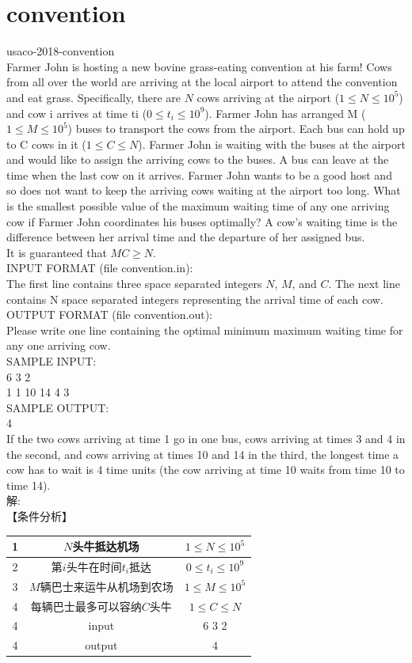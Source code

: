 \documentclass[12pt,twiside,a4paper]{ctexbook}
\numberwithin{chapter}{part}
\begin{document}
\section{convention}
usaco-2018-convention\\
Farmer John is hosting a new bovine grass-eating convention at his farm!
Cows from all over the world are arriving at the local airport to attend the convention and eat grass. Specifically, there are $N$ cows arriving at the airport ($1\leq N\leq 10^5$) and cow i arrives at time ti ($0\leq t_i\leq 10^9$). Farmer John has arranged M ($1\leq M\leq 10^5$) buses to transport the cows from the airport. Each bus can hold up to C cows in it ($1\leq C\leq N$). Farmer John is waiting with the buses at the airport and would like to assign the arriving cows to the buses. A bus can leave at the time when the last cow on it arrives. Farmer John wants to be a good host and so does not want to keep the arriving cows waiting at the airport too long. What is the smallest possible value of the maximum waiting time of any one arriving cow if Farmer John coordinates his buses optimally? A cow’s waiting time is the difference between her arrival time and the departure of her assigned bus.\\
It is guaranteed that $MC\geq N$.\\
INPUT FORMAT (file convention.in):\\
The first line contains three space separated integers $N$, $M$, and $C$. The next line contains N space separated integers representing the arrival time of each cow.\\
OUTPUT FORMAT (file convention.out):\\
Please write one line containing the optimal minimum maximum waiting time for any one arriving cow.\\
SAMPLE INPUT:\\
6 3 2\\
1 1 10 14 4 3\\
SAMPLE OUTPUT:\\
4\\
If the two cows arriving at time 1 go in one bus, cows arriving at times 3 and 4 in the second, and cows arriving at times 10 and 14 in the third, the longest time a cow has to wait is 4 time units (the cow arriving at time 10 waits from time 10 to time 14).\\
解:\\
【条件分析】\\
\begin{tabular}{|c|c|c|}
\hline
1 & $N$头牛抵达机场 & $1\leq N\leq 10^5$\\
\hline
2 & 第$i$头牛在时间$t_i$抵达 & $0\leq t_i\leq 10^9$\\
\hline
3 & $M$辆巴士来运牛从机场到农场 & $1\leq M\leq 10^5$\\
\hline
4 & 每辆巴士最多可以容纳$C$头牛 & $1\leq C\leq N$\\
\hline
4 & input & 6 3 2\\
\hline
4 & output & 4\\
\hline
\end{tabular}
\begin{lstlisting}[language=C++]
\end{lstlisting}



\clearpage
\end{document}
